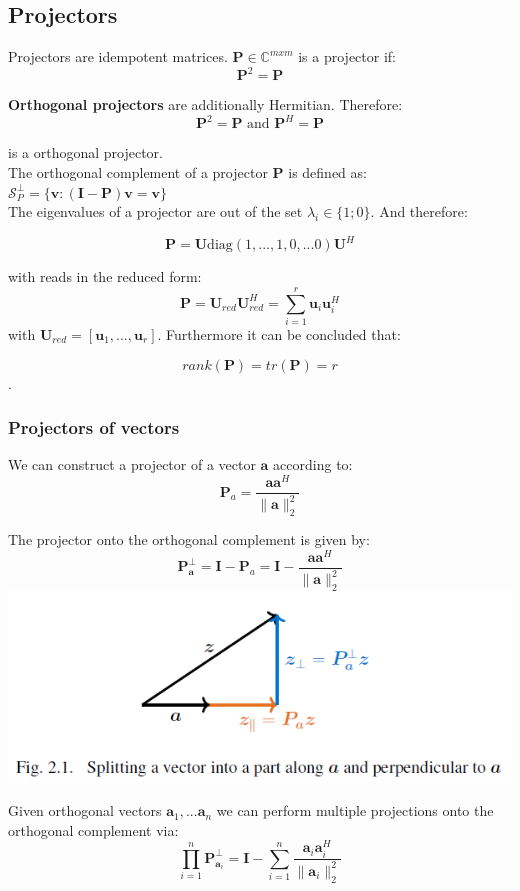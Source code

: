 \documentclass[english]{latex4ei/latex4ei_sheet}
\begin{document}
\begin{sectionbox}
    \subsection{Projectors}
    Projectors are idempotent matrices. $\mathbf{P} \in \mathbb{C}^{mxm}$ is a projector if:\\
    $$\mathbf{P}^2 = \mathbf{P}$$

    \textbf{Orthogonal projectors} are additionally Hermitian. Therefore:\\
    $$\mathbf{P}^2 = \mathbf{P} \text{ and } \mathbf{P}^H=\mathbf{P}$$

    is a orthogonal projector.\\

    The orthogonal complement of a projector $\mathbf{P}$ is defined as:\\
    $\mathcal{S}_P^\perp = \{\mathbf{v}: (\mathbf{I}-\mathbf{P})\mathbf{v}=\mathbf{v}\}$\\

    The eigenvalues of a projector are out of the set $\lambda_i\in\{1;0\}$. And therefore:

    $$\mathbf{P} = \mathbf{U}\text{diag}(1,...,1,0,...0)\mathbf{U}^H$$

    with reads in the reduced form:
    $$\mathbf{P} = \mathbf{U}_{red}\mathbf{U}_{red}^H = \sum_{i=1}^{r}\mathbf{u}_i\mathbf{u}_i^H$$
    with $\mathbf{U}_{red} = [\mathbf{u}_1,...,\mathbf{u}_r]$.
    Furthermore it can be concluded that:

    $$rank(\mathbf{P}) = tr(\mathbf{P}) =r$$.
\end{sectionbox}
\begin{sectionbox}
    \subsubsection{Projectors of vectors}
    We can construct a projector of a vector $\mathbf{a}$ according to:
    $$\mathbf{P}_a = \frac{\mathbf{a}\mathbf{a}^H}{\parallel\mathbf{a}\parallel^2_2}$$

    The projector onto the orthogonal complement is given by:
    $$\mathbf{P}^\perp_\mathbf{a} = \mathbf{I}-\mathbf{P}_a = \mathbf{I} - \frac{\mathbf{a}\mathbf{a}^H}{\parallel\mathbf{a}\parallel^2_2}$$
    \includegraphics[width=\textwidth]{img/vector_decomp.png}

    Given orthogonal vectors $\mathbf{a}_1, ... \mathbf{a}_n$ we can perform multiple projections onto the orthogonal complement via:\\
    $$\prod_{i=1}^n \mathbf{P}_{\mathbf{a}_i}^\perp = \mathbf{I} - \sum_{i=1}^{n}\frac{\mathbf{a}_i\mathbf{a}_i^H}{\parallel\mathbf{a}_i\parallel^2_2}$$
\end{sectionbox}
\end{document}
